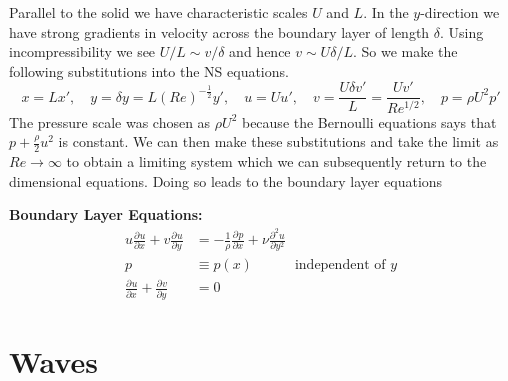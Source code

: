 \documentclass[11pt]{article}
\newcommand*{\pd}[3][]{\ensuremath{\frac{\partial^{#1} {#2}}{\partial {#3}^{#1}}}}
\newenvironment{formula}
	{\begin{mdframed}[backgroundcolor=white, roundcorner=5pt, linewidth=1pt, linecolor=red]}
	{\end{mdframed}}
\begin{document}
Parallel to the solid we have characteristic scales $U$ and $L$.
In the $y$-direction we have strong gradients in velocity across the boundary layer of length $\delta$.
Using incompressibility we see $U/L \sim v/ \delta$ and hence $v \sim U\delta /L$.
So we make the following substitutions into the NS equations.
\[
	x = Lx', \quad y=\delta y=L(Re)^{-\frac{1}{2}}y', \quad u=Uu', \quad v=\frac{U\delta v'}{L}=\frac{Uv'}{Re^{1/2}}, \quad p=\rho U^2 p'
\]
The pressure scale was chosen as $\rho U^2$ because the Bernoulli equations says that $p+\frac{\rho}{2}u^2$ is constant.
We can then make these substitutions and take the limit as $Re\to\infty$ to obtain a limiting system which we can subsequently return to the dimensional equations.
Doing so leads to the boundary layer equations
\begin{formula}
	\textbf{Boundary Layer Equations: }
	\begin{align*}
		u\pd{u}{x} + v\pd{u}{y} &= - \frac{1}{\rho}\pd{p}{x}+\nu\pd[2]{u}{y}\\
		p & \equiv p(x) \quad\quad\quad \text{independent of }y \\
		\pd{u}{x}+ \pd{v}{y}&=0
	\end{align*}
\end{formula}

\section{Waves}
\end{document}
